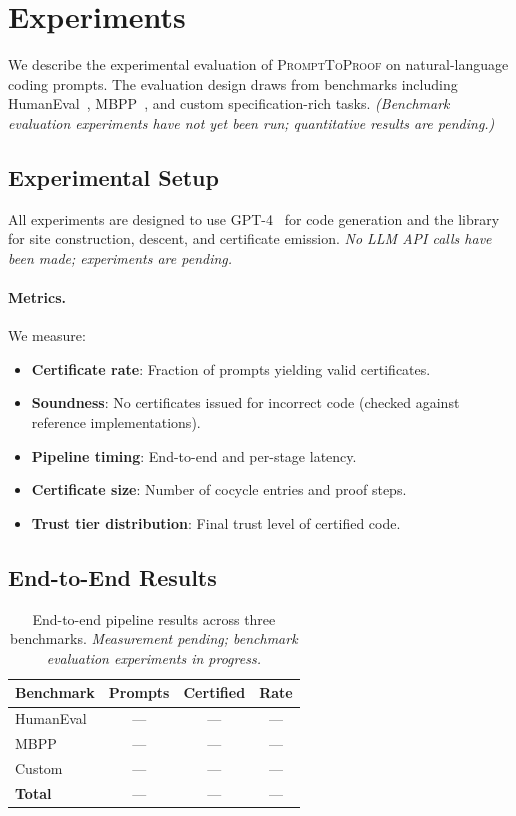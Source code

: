 \documentclass[11pt]{article}
\newcommand{\PromptToProof}{\textsc{PromptToProof}}
\begin{document}
\section{Experiments}\label{sec:experiments}

We describe the experimental evaluation of \PromptToProof{} on natural-language
coding prompts.  The evaluation design draws from benchmarks including HumanEval~\cite{Chen2021},
MBPP~\cite{Austin2021}, and custom specification-rich tasks.
\emph{(Benchmark evaluation experiments have not yet been run; quantitative results are pending.)}

\subsection{Experimental Setup}

All experiments are designed to use GPT-4~\cite{OpenAI2023} for code generation and the
\JuGeo{} \Python{} library for site construction, descent, and
certificate emission.  \emph{No LLM API calls have been made; experiments are pending.}

\paragraph{Metrics.}
We measure:
\begin{itemize}[noitemsep]
  \item \textbf{Certificate rate}: Fraction of prompts yielding valid certificates.
  \item \textbf{Soundness}: No certificates issued for incorrect code (checked against reference implementations).
  \item \textbf{Pipeline timing}: End-to-end and per-stage latency.
  \item \textbf{Certificate size}: Number of cocycle entries and proof steps.
  \item \textbf{Trust tier distribution}: Final trust level of certified code.
\end{itemize}

\subsection{End-to-End Results}

\begin{table}[t]
\centering
\caption{End-to-end pipeline results across three benchmarks.
  \emph{Measurement pending; benchmark evaluation experiments in progress.}}\label{tab:e2e}
\begin{tabular}{lccc}
\toprule
\textbf{Benchmark} & \textbf{Prompts} & \textbf{Certified} & \textbf{Rate} \\
\midrule
HumanEval & --- & --- & --- \\
MBPP      & --- & --- & --- \\
Custom    & --- & --- & --- \\
\midrule
\textbf{Total} & --- & --- & --- \\
\bottomrule
\end{tabular}
\end{table}
\end{document}
